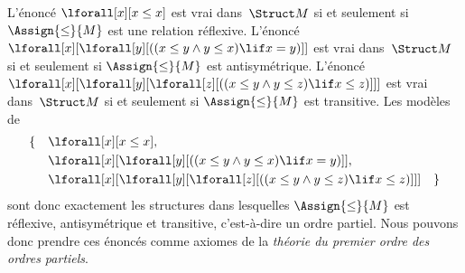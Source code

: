 \documentclass[../../../include/open-logic-section]{subfiles}
\begin{document}
\begin{ex}
L'énoncé $\lforall[x][x \le x]$ est vrai dans~$\Struct M$ si et
seulement si $\Assign{\le}{M}$ est une relation réflexive. L'énoncé
$\lforall[x][\lforall[y][((x \le y \land y \le x) \lif x = y)]]$
est vrai dans~$\Struct M$ si et seulement si $\Assign{\le}{M}$
est antisymétrique. L'énoncé
$\lforall[x][\lforall[y][\lforall[z][((x \le y \land y \le z)
      \lif x \le z)]]]$ est vrai dans~$\Struct M$ si et seulement si
$\Assign{\le}{M}$ est transitive. Les modèles de
\begin{align*}
\{\quad &\lforall[x][x \le x], \\
   & \lforall[x][\lforall[y][((x \le y \land y \le
    x) \lif x = y)]], \\
   &\lforall[x][\lforall[y][\lforall[z][((x \le y
      \land y \le z) \lif x \le z)]]] \quad \}
\end{align*}
sont donc exactement les structures dans lesquelles
$\Assign{\le}{M}$ est réflexive, antisymétrique et transitive,
c'est-à-dire un ordre partiel. Nous pouvons donc prendre ces énoncés
comme axiomes de la \emph{théorie du premier ordre des ordres
partiels}.
\end{ex}
\end{document}

